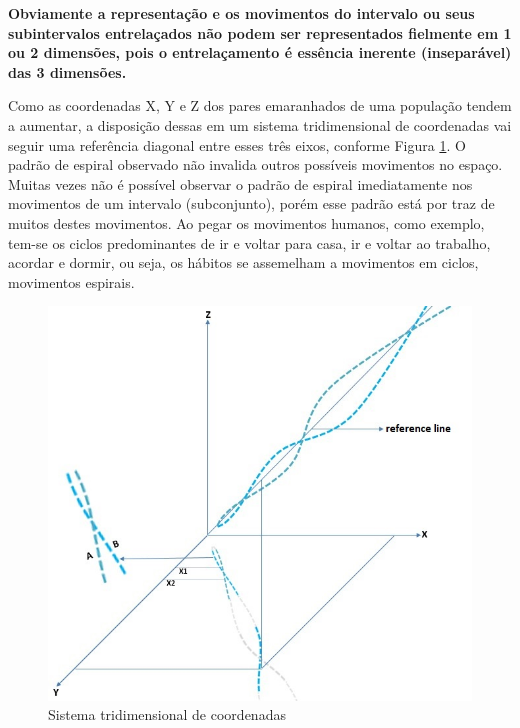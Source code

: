 \textbf{Obviamente a representação e os movimentos do intervalo ou seus subintervalos entrelaçados não podem ser representados fielmente em 1 ou 2 dimensões, pois o entrelaçamento é essência inerente (inseparável) das 3 dimensões.} 
	
Como as coordenadas X, Y e Z dos pares emaranhados de uma população tendem a aumentar, a disposição dessas em um sistema tridimensional de coordenadas vai seguir uma referência diagonal entre esses três eixos, conforme Figura \ref{fig:consciousness_space_spiral_reference_line}. O padrão de espiral observado não invalida outros possíveis movimentos no espaço. Muitas vezes não é possível observar o padrão de espiral imediatamente nos movimentos de um intervalo (subconjunto), porém esse padrão está por traz de muitos destes movimentos. Ao pegar os movimentos humanos, como exemplo, tem-se os ciclos predominantes de ir e voltar para casa, ir e voltar ao trabalho, acordar e dormir, ou seja, os hábitos se assemelham a movimentos em ciclos, movimentos espirais.
	\begin{figure}[H]
	\caption{Sistema tridimensional de coordenadas}
	\label{fig:consciousness_space_spiral_reference_line}
	\centering
	\includegraphics[scale=.6]{sections/images/consciousness_space_spiral_reference_line.jpg}
	\end{figure}

